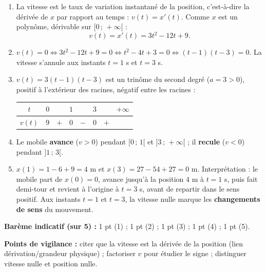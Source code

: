 \documentclass[11pt]{article}
\begin{document}
\begin{corrige}
\begin{enumerate}
\item La vitesse est le taux de variation instantané de la position, c'est-à-dire la dérivée de $x$ par rapport au temps : $v(t)=x'(t)$. Comme $x$ est un polynôme, dérivable sur $[0\,;\,+\infty[$ :
\[ v(t)=x'(t)=3t^2-12t+9. \]
\item $v(t)=0\iff 3t^2-12t+9=0\iff t^2-4t+3=0\iff (t-1)(t-3)=0$. La vitesse s'annule aux instants $t=1$ s et $t=3$ s.
\item $v(t)=3(t-1)(t-3)$ est un trinôme du second degré ($a=3>0$), positif à l'extérieur des racines, négatif entre les racines :

\begin{center}
\begin{tabular}{|c|ccccccc|}\hline
$t$ & $0$ & & $1$ & & $3$ & & $+\infty$ \\ \hline
$v(t)$ & $9$ & $+$ & $0$ & $-$ & $0$ & $+$ & \\ \hline
\end{tabular}
\end{center}
\item Le mobile \textbf{avance} ($v>0$) pendant $[0\,;\,1[$ et $]3\,;\,+\infty[$ ; il \textbf{recule} ($v<0$) pendant $]1\,;\,3[$.
\item $x(1)=1-6+9=4$ m et $x(3)=27-54+27=0$ m. Interprétation : le mobile part de $x(0)=0$, avance jusqu'à la position $4$ m à $t=1$ s, puis fait demi-tour et revient à l'origine à $t=3$ s, avant de repartir dans le sens positif. Aux instants $t=1$ et $t=3$, la vitesse nulle marque les \textbf{changements de sens} du mouvement.
\end{enumerate}
\textbf{Barème indicatif (sur 5) :} 1 pt (1) ; 1 pt (2) ; 1 pt (3) ; 1 pt (4) ; 1 pt (5).

\textbf{Points de vigilance :} citer que la vitesse est la dérivée de la position (lien dérivation/grandeur physique) ; factoriser $v$ pour étudier le signe ; distinguer vitesse nulle et position nulle.
\end{corrige}
\end{document}
